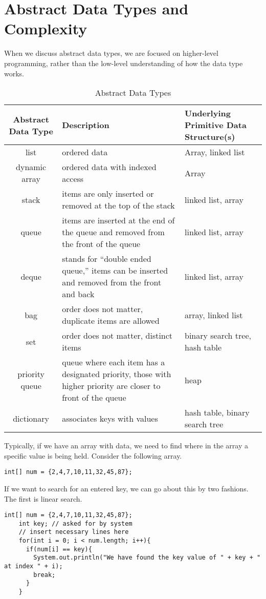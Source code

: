 \documentclass[10pt]{mypackage}
\begin{document}
  \section{Abstract Data Types and Complexity}%
  When we discuss abstract data types, we are focused on higher-level programming, rather than the low-level understanding of how the data type works.
\begin{table}[h]
    \footnotesize
    \renewcommand{\arraystretch}{1.5}
    \centering
    \begin{tabularx}{\textwidth}{>{\centering\arraybackslash}c|>{\centering\arraybackslash}X|>{\centering\arraybackslash}X}
      Abstract Data Type & Description & Underlying Primitive Data Structure(s)\\
      \hline \hline
      list & ordered data & Array, linked list\\
      dynamic array & ordered data with indexed access & Array\\
      stack & items are only inserted or removed at the top of the stack & linked list, array\\
      queue & items are inserted at the end of the queue and removed from the front of the queue & linked list, array\\
      deque & stands for ``double ended queue,'' items can be inserted and removed from the front and back & linked list, array\\
      bag & order does not matter, duplicate items are allowed & array, linked list\\
      set & order does not matter, distinct items & binary search tree, hash table\\
      priority queue & queue where each item has a designated priority, those with higher priority are closer to front of the queue & heap\\
      dictionary & associates keys with values & hash table, binary search tree
    \end{tabularx}
    \caption{Abstract Data Types}
\end{table}
  Typically, if we have an array with data, we need to find where in the array a specific value is being held. Consider the following array.
  \begin{lstlisting}[style=javastyle,title=Searching An Array]
    int[] num = {2,4,7,10,11,32,45,87};
  \end{lstlisting}
  If we want to search for an entered key, we can go about this by two fashions. The first is linear search.
  \begin{lstlisting}[style=javastyle,title=Linear Search]
    int[] num = {2,4,7,10,11,32,45,87};
    int key; // asked for by system
    // insert necessary lines here
    for(int i = 0; i < num.length; i++){
      if(num[i] == key){
        System.out.println("We have found the key value of " + key + " at index " + i);
        break;
      }
    }
  \end{lstlisting}
\end{document}
